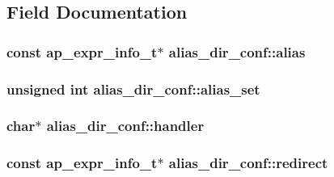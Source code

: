 \subsection{Field Documentation}
\subsubsection[{\texorpdfstring{alias}{alias}}]{\setlength{\rightskip}{0pt plus 5cm}const {\bf ap\+\_\+expr\+\_\+info\+\_\+t}$\ast$ alias\+\_\+dir\+\_\+conf\+::alias}\hypertarget{structalias__dir__conf_a2ce54a24cdd17887166cc4698c2e01a8}{}\label{structalias__dir__conf_a2ce54a24cdd17887166cc4698c2e01a8}
\subsubsection[{\texorpdfstring{alias\+\_\+set}{alias_set}}]{\setlength{\rightskip}{0pt plus 5cm}unsigned {\bf int} alias\+\_\+dir\+\_\+conf\+::alias\+\_\+set}\hypertarget{structalias__dir__conf_a41f9e18a640c5f41ad4d334a5ac570fd}{}\label{structalias__dir__conf_a41f9e18a640c5f41ad4d334a5ac570fd}
\subsubsection[{\texorpdfstring{handler}{handler}}]{\setlength{\rightskip}{0pt plus 5cm}char$\ast$ alias\+\_\+dir\+\_\+conf\+::handler}\hypertarget{structalias__dir__conf_a812a976917626b496e40cbeb6ef3a758}{}\label{structalias__dir__conf_a812a976917626b496e40cbeb6ef3a758}
\subsubsection[{\texorpdfstring{redirect}{redirect}}]{\setlength{\rightskip}{0pt plus 5cm}const {\bf ap\+\_\+expr\+\_\+info\+\_\+t}$\ast$ alias\+\_\+dir\+\_\+conf\+::redirect}\hypertarget{structalias__dir__conf_ad6dc65decc1f0c71f7b5ac908ea107c6}{}\label{structalias__dir__conf_ad6dc65decc1f0c71f7b5ac908ea107c6}
